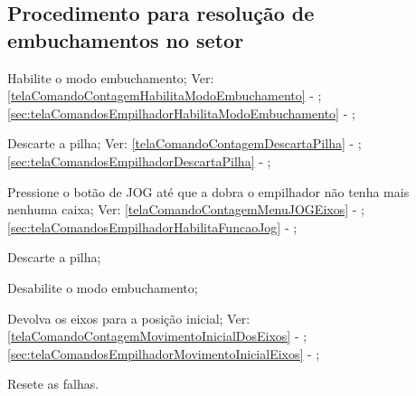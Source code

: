 \fi

\subsection{Procedimento para resolução de embuchamentos no setor   \fi}


\begin{procedureFixingIsuesSector3}

  \item[\ding{\dingNumber}] Habilite o modo embuchamento; Ver:
  \ifmachineType
  \ref{telaComandoContagemHabilitaModoEmbuchamento} - ;
  \else
  \ref{sec:telaComandosEmpilhadorHabilitaModoEmbuchamento} - ;
  \fi
  \item[\ding{\dingNumber}] Descarte a pilha; Ver:
  \ifmachineType
  \ref{telaComandoContagemDescartaPilha} - ;
  \else
  \ref{sec:telaComandosEmpilhadorDescartaPilha} - ;
  \fi
  \item[\ding{\dingNumber}] Pressione o botão de JOG até que \ifmachineType a dobra \else o empilhador \fi não tenha mais nenhuma caixa; Ver:
  \ifmachineType
  \ref{telaComandoContagemMenuJOGEixos} - ;
  \else
  \ref{sec:telaComandosEmpilhadorHabilitaFuncaoJog} - ;
  \fi
  \item[\ding{\dingNumber}] Descarte a pilha;
  \item[\ding{\dingNumber}] Desabilite o modo embuchamento;
  \item[\ding{\dingNumber}] Devolva os eixos para a posição inicial; Ver:
  \ifmachineType
  \ref{telaComandoContagemMovimentoInicialDosEixos} - ;
  \else
  \ref{sec:telaComandosEmpilhadorMovimentoInicialEixos} - ;
  \fi
  \item[\ding{\dingNumber}] Resete as falhas.
  
\end{procedureFixingIsuesSector3}

